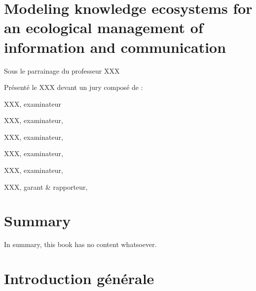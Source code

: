 \documentclass[
  letterpaper,
  DIV=11,
  numbers=noendperiod]{scrreprt}
\begin{document}


\hypertarget{modeling-knowledge-ecosystems-for-an-ecological-management-of-information-and-communication}{%
\chapter*{Modeling knowledge ecosystems for an ecological management of
information and
communication}\label{modeling-knowledge-ecosystems-for-an-ecological-management-of-information-and-communication}}


Sous le parrainage du professeur XXX

Présenté le XXX devant un jury composé de :

XXX, examinateur

XXX, examinateur,

XXX, examinateur,

XXX, examinateur,

XXX, examinateur,

XXX, garant \& rapporteur,


\hypertarget{summary}{%
\chapter*{Summary}\label{summary}}


In summary, this book has no content whatsoever.


\hypertarget{sec-introductionGen}{%
\chapter*{Introduction générale}\label{sec-introductionGen}}
\end{document}
